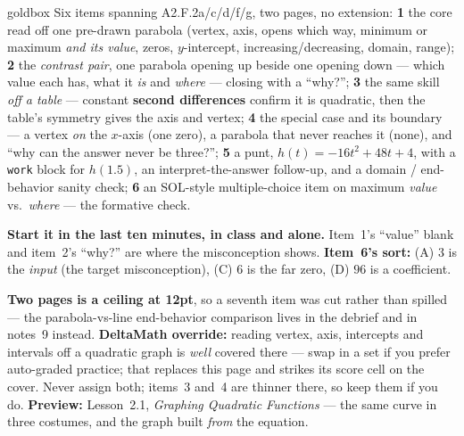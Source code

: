 \documentclass[10pt]{article}
\begin{document}
\boxguard
\begin{skillbox}{goldbox}
Six items spanning A2.F.2a/c/d/f/g, two pages, no extension: \textbf{1} the core read off one
pre-drawn parabola (vertex, axis, opens which way, minimum or maximum \emph{and its value}, zeros,
$y$-intercept, increasing/decreasing, domain, range); \textbf{2} the \emph{contrast pair}, one
parabola opening up beside one opening down --- which value each has, what it \emph{is} and
\emph{where} --- closing with a ``why?''; \textbf{3} the same skill \emph{off a table} --- constant
\textbf{second differences} confirm it is quadratic, then the table's symmetry gives the axis and
vertex; \textbf{4} the special case and its boundary --- a vertex \emph{on} the $x$-axis (one
zero), a parabola that never reaches it (none), and ``why can the answer never be three?'';
\textbf{5} a punt, $h(t)=-16t^2+48t+4$, with a \texttt{work} block for $h(1.5)$, an
interpret-the-answer follow-up, and a domain / end-behavior sanity check; \textbf{6} an SOL-style
multiple-choice item on maximum \emph{value} vs.\ \emph{where} --- the formative check.

\textbf{Start it in the last ten minutes, in class and alone.} Item~1's ``value'' blank and
item~2's ``why?'' are where the misconception shows. \textbf{Item~6's sort:} (A) $3$ is the
\emph{input} (the target misconception), (C) $6$ is the far zero, (D) $96$ is a coefficient.

\textbf{Two pages is a ceiling at 12pt}, so a seventh item was cut rather than spilled --- the
parabola-vs-line end-behavior comparison lives in the debrief and in notes~9 instead.
\textbf{DeltaMath override:} reading vertex, axis, intercepts and intervals off a quadratic graph
is \emph{well} covered there --- swap in a set if you prefer auto-graded practice; that replaces
this page and strikes its score cell on the cover. Never assign both; items~3 and~4 are thinner
there, so keep them if you do. \textbf{Preview:} Lesson~2.1, \emph{Graphing Quadratic Functions}
--- the same curve in three costumes, and the graph built \emph{from} the equation.
\end{skillbox}
\end{document}
